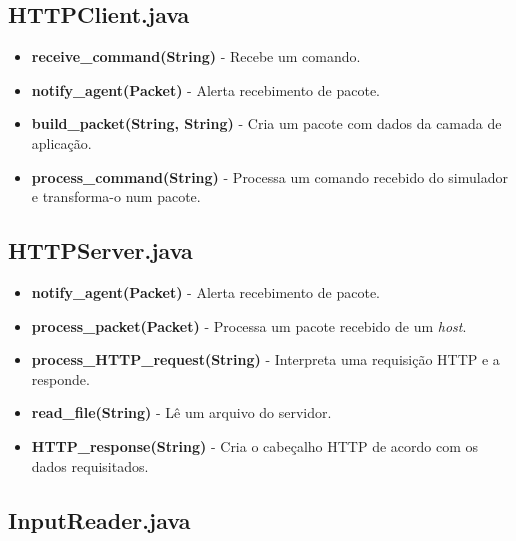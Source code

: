 \documentclass[11pt]{article}
\begin{document}
\subsection{HTTPClient.java}

\begin{itemize}
	\item \textbf{receive\_command(String)} - Recebe um comando.
	\item \textbf{notify\_agent(Packet)} - Alerta recebimento de pacote.
	\item \textbf{build\_packet(String, String)} - Cria um pacote com dados da camada de aplicação.
	\item \textbf{process\_command(String)} - Processa um comando recebido do simulador e transforma-o num pacote.
\end{itemize}

\subsection{HTTPServer.java}

\begin{itemize}
	\item \textbf{notify\_agent(Packet)} - Alerta recebimento de pacote.
	\item \textbf{process\_packet(Packet)} - Processa um pacote recebido de um \textit{host}.
	\item \textbf{process\_HTTP\_request(String)} - Interpreta uma requisição HTTP e a responde.
	\item \textbf{read\_file(String)} - Lê um arquivo do servidor.
	\item \textbf{HTTP\_response(String)} - Cria o cabeçalho HTTP de acordo com os dados requisitados.
\end{itemize}

\subsection{InputReader.java}
\end{document}

